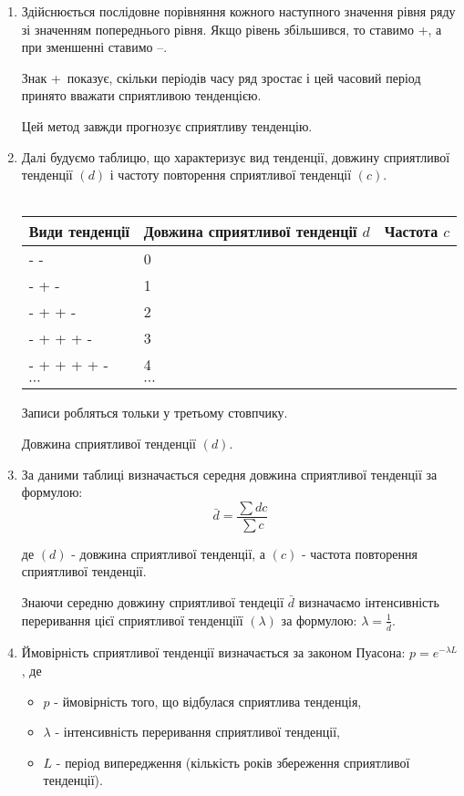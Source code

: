 \documentclass[11pt,a4paper]{article}
\begin{document}
\begin{enumerate}
\item Здійснюється послідовне порівняння кожного наступного значення рівня ряду зі значенням попереднього рівня. Якщо рівень збільшився, то ставимо \glqq +\grqq{}, а при зменшенні ставимо \glqq --\grqq.
\par \hspace{1.4cm}Знак \glqq +\grqq \ показує, скільки періодів часу ряд зростає і цей часовий період принято вважати сприятливою тенденцією.
\par \hspace{1.4cm} Цей метод завжди прогнозує сприятливу тенденцію.
\item Далі будуємо таблицю, що характеризує вид тенденції, довжину сприятливої тенденції $\left (d \right )$ і частоту повторення сприятливої тенденції $\left (c \right )$.
\\
\\
\vspace{\baselineskip}
\hspace{1.4cm}\begin{tabular}[central]{ | l | l | l | }
\hline
Види тенденції & Довжина сприятливої тенденції $d$ & Частота $c$ \\ \hline
- -  & 0 &  \\
- + - & 1 &  \\
- + + - & 2 &  \\
- + + + - & 3 &  \\
- + + + + - & 4 &  \\
$\cdots$ & $\cdots$ &  \\
\hline
\end{tabular}
\par \hspace{1.4cm}Записи робляться тольки у третьому стовпчику.
\par \hspace{1.4cm}Довжина сприятливої тенденції $\left (d \right )$.
\item За даними таблиці визначається середня довжина сприятливої тенденції за формулою:
$$\bar{d}=\frac{\sum d c}{\sum c}$$
\par \hspace{1.4cm} де $\left (d \right )$ - довжина сприятливої тенденції, а $\left (c \right )$ - частота повторення сприятливої тенденції.
\par \hspace{1.4cm} Знаючи середню довжину сприятливої тендеції $\bar{d}$ визначаємо інтенсивність переривання цієї сприятливої тенденціїї $\left ( \lambda  \right )$ за формулою: $\lambda =\frac{1}{\bar{d}}$.
\item Ймовірність сприятливої тенденції визначається за законом Пуасона: $p = e^{-\lambda L}$, де
\\
\begin{itemize}
\item[] $p$ - ймовірність того, що відбулася сприятлива тенденція, 
\item[] $\lambda$ - інтенсивність переривання сприятливої тенденції,
\item[] $L$ - період випередження (кількість років збереження сприятливої тенденції).
\end{itemize}

\end{enumerate}
\end{document}
